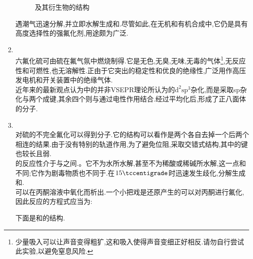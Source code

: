 \documentclass{ctexart}
\begin{document}
\begin{enumerate}[label=\tbf{\arabic*},topsep=0pt,parsep=0pt,itemsep=0pt,partopsep=0pt]
\begin{figure}[H]
{\begin{minipage}[b]{.3\linewidth}
                \end{minipage}
            }
            \caption{及其衍生物的结构}
        \end{figure}
        遇潮气迅速分解,并立即水解生成和.尽管如此,在无机和有机合成中,它仍是具有高度选择性的强氟化剂,用途颇为广泛.
    \item {}\\
        \indent 六氟化硫可由硫在氟气氛中燃烧制得.它是无色,无臭,无味,无毒的气体\footnote{少量吸入可以让声音变得粗犷,这和吸入使得声音变细正好相反.请勿自行尝试此实验,以避免窒息风险.},无反应性和可燃性,也无溶解性.正由于它突出的稳定性和优良的绝缘性,广泛用作高压发电机和开关装置中的绝缘气体.\\
        \indent 近年来的最新观点认为中的并非VSEPR理论所认为的$\text{d}^2\text{sp}^3$杂化,而是采取sp杂化与两个成键,其余四个则与通过电性作用结合.经过平均化后,形成了正八面体的分子.
    \item {}\\
        \indent 对硫的不完全氟化可以得到分子.它的结构可以看作是两个各自去掉一个后两个相连的结果.由于没有特别的轨道作用,为了避免位阻,采取交错式结构,其中的键也较长且弱.\\
        \indent {}的反应性介于与之间.。它不为水所水解,甚至不为稀酸或稀碱所水解,这一点和不同;它作为剧毒物质也不同于.在$15\tccentigrade$时迅速发生歧化,分解生成和.\\
        \indent {}可以在丙酮溶液中氧化而析出.一个小把戏是还原产生的可以对丙酮进行氟化,因此反应的方程式应当为:
        \begin{center}
        \end{center}
        下面是和的结构.
        \begin{figure}[H]
            \centering
\end{figure}
\end{enumerate}
\end{document}
